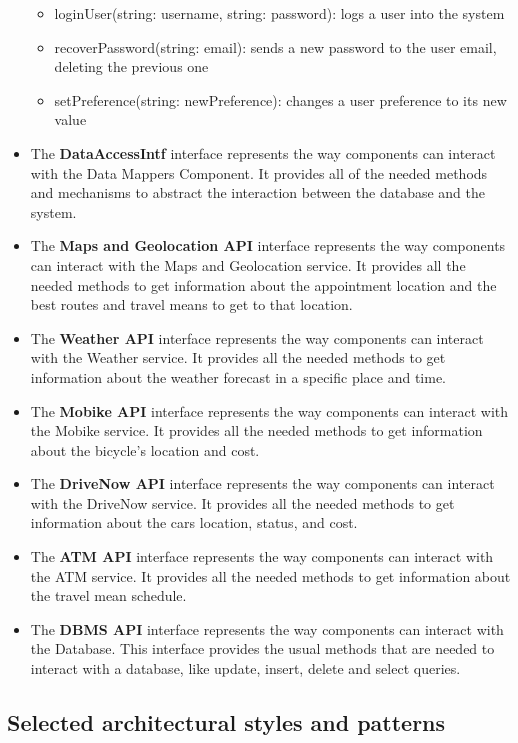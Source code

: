 \documentclass[12pt]{article}
\begin{document}
\begin{itemize}
\begin{itemize}
        \item loginUser(string: username, string: password): logs a user into the system
         \item recoverPassword(string: email): sends a new password to the user email, deleting the previous one
        \item setPreference(string: newPreference): changes a user preference to its new value
    \end{itemize}
    \item The \textbf{DataAccessIntf} interface represents the way components can interact with the Data Mappers Component. It provides all of the needed methods and mechanisms to abstract the interaction between the database and the system.
    \item The \textbf{Maps and Geolocation API} interface represents the way components can interact with the Maps and Geolocation service. It provides all the needed methods to get information about the appointment location and the best routes and travel means to get to that location.
    \item The \textbf{Weather API} interface represents the way components can interact with the Weather service. It provides all the needed methods to get information about the weather forecast in a specific place and time.
    \item The \textbf{Mobike API} interface represents the way components can interact with the Mobike service. It provides all the needed methods to get information about the bicycle's location and cost.
    \item The \textbf{DriveNow API} interface represents the way components can interact with the DriveNow service. It provides all the needed methods to get information about the cars location, status, and cost.
    \item The \textbf{ATM API} interface represents the way components can interact with the ATM service. It provides all the needed methods to get information about the travel mean schedule.
    \item The \textbf{DBMS API} interface represents the way components can interact with the Database. This interface provides the usual methods that are needed to interact with a database, like update, insert, delete and select queries.
\end{itemize}


\subsection{Selected architectural styles and patterns}
\end{document}
